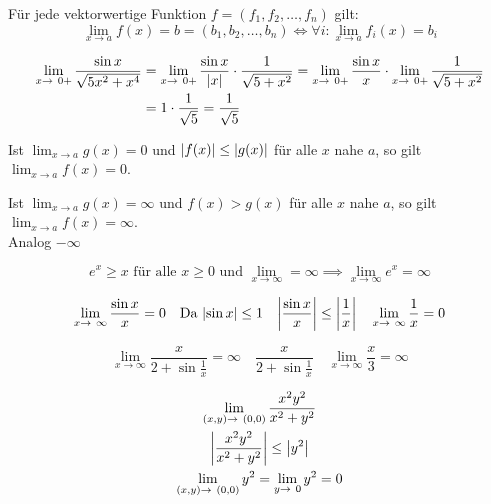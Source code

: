 \begin{fakt}
	Für jede vektorwertige Funktion $f = (f_1, f_2, \dotsc , f_n)$ gilt:
	\[ \lim_{x \rightarrow a} f(x) = b = (b_1, b_2, \dotsc , b_n) \iff \forall i : \lim_{x \rightarrow a} f_i(x) = b_i \]
\end{fakt}
\begin{bsp*}
	\[ \begin{split}
		\lim_{x \rightarrow 0+} \frac{\sin x}{\sqrt{5x^2 + x^4}}	&= \lim_{x \rightarrow 0+} \frac{\sin x}{\abs{x}} \cdot \frac{1}{\sqrt{5 + x^2}} = \lim_{x \rightarrow 0+} \frac{\sin x}{x} \cdot \lim_{x \rightarrow 0+} \frac{1}{\sqrt{5 + x^2}} \\
												&= 1 \cdot \frac{1}{\sqrt{5}} = \frac{1}{\sqrt{5}}
	\end{split} \]
\end{bsp*}
\begin{def*}[note = Majorantenkriterium , index = Majorantenkriterium]
	Ist $\lim_{x \rightarrow a} g(x) = 0$ und $\abs{f(x)} \leq \abs{g(x)}$ für alle $x$ nahe $a$, so gilt $\lim_{x \rightarrow a} f(x) = 0$.
\end{def*}
\begin{def*}[note = Minorantenkriterium , index = Majorantenkriterium]
	Ist $\lim_{x \rightarrow a} g(x) = \infty$ und $f(x) > g(x)$ für alle $x$ nahe $a$, so gilt $\lim_{x \rightarrow a} f(x) = \infty$. \\
	Analog $-\infty$
\end{def*}
\begin{bsp*}
	\[ e^x \geq x \text{ für alle } x \geq 0 \text{ und } \lim_{x \rightarrow \infty} = \infty \implies \lim_{x \rightarrow \infty} e^x = \infty \]
\end{bsp*}
\begin{bsp*}
	\[ \lim_{x \rightarrow \infty} \frac{\sin x}{x} = 0 \quad \text{Da } \abs{\sin x} \leq 1 \quad \abs{\frac{\sin x}{x}} \leq \abs{\frac{1}{x}} \quad \lim_{x \rightarrow \infty} \frac{1}{x} = 0 \]
\end{bsp*}
\begin{bsp*}
	\[ \lim_{x \rightarrow \infty} \frac{x}{2 + \sin \frac{1}{x}} = \infty \quad \frac{x}{2 + \sin \frac{1}{x}} \quad \lim_{x \rightarrow \infty} \frac{x}{3} = \infty \]
\end{bsp*}
\begin{bsp*}
	\begin{gather*}
		\lim_{(x,y) \rightarrow (0,0)} \frac{x^2 y^2}{x^2 + y^2} \\
		\abs{\frac{x^2 y^2}{x^2 + y^2}} \leq \abs{y^2} \\
		\lim_{(x,y) \rightarrow (0,0)} y^2 = \lim_{y \rightarrow 0} y^2 = 0
	\end{gather*}
\end{bsp*}

